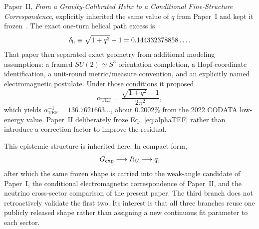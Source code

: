 \documentclass[10pt,twocolumn]{article}
\newcommand{\TEF}{\mathrm{TEF}}
\begin{document}
Paper~II, \emph{From a Gravity-Calibrated Helix to a Conditional Fine-Structure
Correspondence}, explicitly inherited the same value of $q$ from Paper~I and
kept it frozen~\cite{WuII}.  The exact one-turn helical path excess is
\begin{equation}
\delta_{\rm h}
\equiv
\sqrt{1+q^2}-1
=0.144332378858\ldots .
\label{eq:dh}
\end{equation}
That paper then separated exact geometry from additional modeling assumptions:
a framed $SU(2)\simeq S^3$ orientation completion, a Hopf-coordinate
identification, a unit-round metric/measure convention, and an explicitly named
electromagnetic postulate.  Under those conditions it proposed
\begin{equation}
\alpha_{\TEF}
=
\frac{\sqrt{1+q^2}-1}{2\pi^2},
\label{eq:alphaTEF}
\end{equation}
which yields
$\alpha^{-1}_{\TEF}=136.7621663\ldots$, about $0.2002\%$ from the 2022 CODATA
low-energy value.  Paper~II deliberately froze Eq.~\eqref{eq:alphaTEF} rather
than introduce a correction factor to improve the residual.

This epistemic structure is inherited here.  In compact form,
\begin{equation}
G_{\rm exp}\longrightarrow R_G\longrightarrow q,
\label{eq:sequence}
\end{equation}
after which the same frozen shape is carried into the weak-angle candidate of
Paper~I, the conditional electromagnetic correspondence of Paper~II, and the
neutrino cross-sector comparison of the present paper.
The third branch does not retroactively validate the first two.  Its interest is
that all three branches reuse one publicly released shape rather than assigning a
new continuous fit parameter to each sector.
\end{document}
